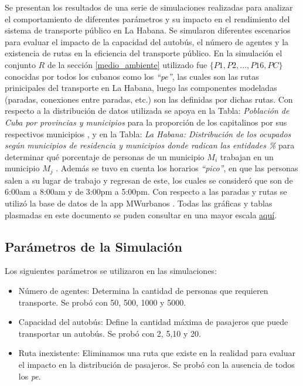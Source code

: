 \documentclass[a4paper,12pt]{article}
\begin{document}
Se presentan los resultados de una serie de simulaciones realizadas para analizar el comportamiento de diferentes parámetros y su impacto en el rendimiento del sistema de transporte público en La Habana. Se simularon diferentes escenarios para evaluar el impacto de la capacidad del autobús, el número de agentes y la existencia de rutas en la eficiencia del transporte público. En la simulaci\'on el conjunto $R$ de la secci\'on \ref{medio_ambiente}  utilizado fue $\{P1,P2,...,P16,PC\}$ conocidas por todos los cubanos como los \textit{``pe''}, las cuales son las rutas prinicipales del transporte en La Habana, luego las componentes modeladas (paradas, conexiones entre paradas, etc.) son las definidas por dichas rutas. Con respecto a la distribuci\'on de datos utilizada se apoya en la Tabla: \textit{Poblaci\'on de Cuba por provincias y municipios} para la proporci\'on de los capitalinos por sus respectivos municipios \cite{onei2022}, y en la Tabla: \textit{La Habana: Distribuci\'on de los ocupados seg\'un municipios de residencia y municipios donde radican las entidades \%} para determinar qu\'e porcentaje de personas de un municipio $M_i$ trabajan en un municipio $M_j$ \cite{aja2023}.  Adem\'as se tuvo en cuenta los horarios \textit{``pico''}, en que las personas salen a su lugar de trabajo y regresan de este, los cuales se consider\'o que son de 6:00am a 8:00am y de 3:00pm a 5:00pm. Con respecto a las paradas y rutas se utiliz\'o la base de datos de  la app MWurbanos \cite{apklis}. Todas las gr\'aficas y tablas plasmadas en este documento se puden consultar en una mayor escala \href{https://github.com/YoanRene/AI-Sim/tree/master/docs/imgs}{aqu\'i}. 

\subsection{Parámetros de la Simulación}

Los siguientes parámetros se utilizaron en las simulaciones:

\begin{itemize}
\item Número de agentes: Determina la cantidad de personas que requieren transporte. Se prob\'o con 50, 500, 1000 y 5000.
\item Capacidad del autobús: Define la cantidad máxima de pasajeros que puede transportar un autobús. Se prob\'o con 2, 5,10 y 20.
\item Ruta inexistente: Eliminamos una ruta que existe en la realidad para evaluar el impacto en la distribución de pasajeros. Se prob\'o con la ausencia de todos los \textit{pe}.
\end{itemize}
\end{document}
